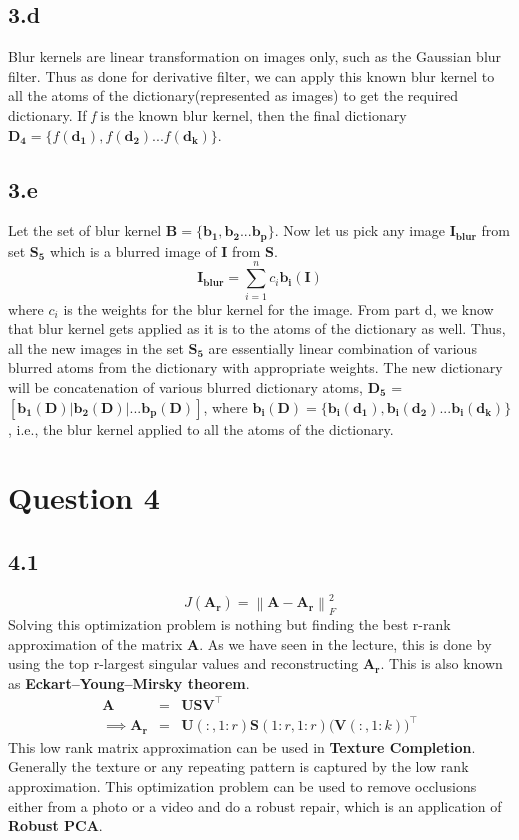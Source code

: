 \documentclass[12pt]{article}
\newcommand{\norm}[1]{\left\lVert #1 \right\rVert}
\begin{document}
\subsection*{3.d}
Blur kernels are linear transformation on images only, such as the Gaussian blur filter. Thus as done for derivative filter, we can apply this known blur kernel to all the atoms of the dictionary(represented as images) to get the required dictionary. If \textit{f} is the known blur kernel, then the final dictionary $\boldsymbol{D_4} = \{f(\boldsymbol{d_1}), f(\boldsymbol{d_2})... f(\boldsymbol{d_k})\}$.
\subsection*{3.e}
Let the set of blur kernel $\boldsymbol{B} = \{\boldsymbol{b_1}, \boldsymbol{b_2}... \boldsymbol{b_p}\}$. Now let us pick any image $\boldsymbol{I_{blur}}$ from set $\boldsymbol{S_5}$ which is a blurred image of $\boldsymbol{I}$ from $\boldsymbol{S}$.
\begin{equation*}
	\boldsymbol{I_{blur}} = \sum_{i=1}^{n}c_i\boldsymbol{b_i(I)}
\end{equation*}
where $c_i$ is the weights for the blur kernel for the image. From part d, we know that blur kernel gets applied as it is to the atoms of the dictionary as well. Thus, all the new images in the set $\boldsymbol{S_5}$ are essentially linear combination of various blurred atoms from the dictionary with appropriate weights. The new dictionary will be concatenation of various blurred dictionary atoms, $\boldsymbol{D_5}$ = $[\boldsymbol{b_1(D)}| \boldsymbol{b_2(D)}|... \boldsymbol{b_p(D)}]$, where $\boldsymbol{b_i(D)} = \{\boldsymbol{b_i(d_1)}, \boldsymbol{b_i(d_2)}... \boldsymbol{b_i(d_k)}\}$, i.e., the blur kernel applied to all the atoms of the dictionary.
\section*{Question 4}
\subsection*{4.1}
$$J(\boldsymbol{A_r}) = \norm{\boldsymbol{A} - \boldsymbol{A_r}}_F^2$$
Solving this optimization problem is nothing but finding the best r-rank approximation of the matrix $\boldsymbol{A}$.  As we have seen in the lecture, this is done by using the top r-largest singular values and reconstructing $\boldsymbol{A_r}$. This is also known as \textbf{Eckart–Young–Mirsky theorem}. 
\begin{eqnarray*}
	\boldsymbol{A} &=& \boldsymbol{U} \boldsymbol{S} \boldsymbol{V}^\intercal \\
	\implies \boldsymbol{A_r} &=& \boldsymbol{U}(:,1:r) \boldsymbol{S}(1:r,1:r)\bigg(\boldsymbol{V}(:,1:k) \bigg)^\intercal
\end{eqnarray*}
\newline
This low rank matrix approximation can be used in \textbf{Texture Completion}. Generally the texture or any repeating pattern is captured by the low rank approximation. This optimization problem can be used to remove occlusions either from a photo or a video and do a robust repair, which is an application of \textbf{Robust PCA}.
\end{document}
